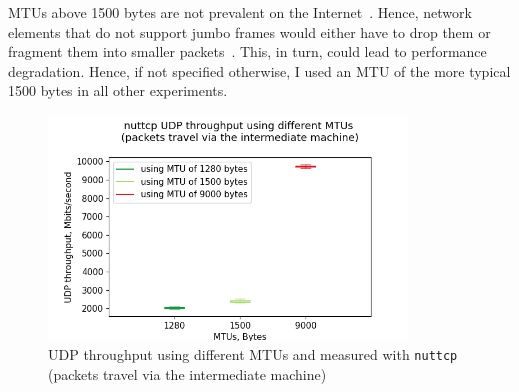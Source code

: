 \documentclass[12pt,a4paper]{report}
\begin{document}
    MTUs above 1500 bytes are not prevalent on the Internet~\cite{why-is-ethernet-mtu-1500}.
    Hence, network elements that do not support jumbo frames would either have to drop them or fragment them into smaller packets~\cite{Large_MTUs_and_Internet_Performance}.
    This, in turn, could lead to performance degradation.
    Hence, if not specified otherwise, I used an MTU of the more typical 1500 bytes in all other experiments.
    
    
  
  
    \begin{figure}[htbp]
    \centering
    \includegraphics[width=0.85\textwidth]{figs/UDP throughput using different MTUs and measured with nuttcp (packets travel via the intermediate machine).png}
    \caption{UDP throughput using different MTUs and measured with \texttt{nuttcp} (packets travel via the intermediate machine)}
    \label{fig:UDP_throughput_with_different_MTUs}
    \end{figure}
    
    
  
\end{document}
